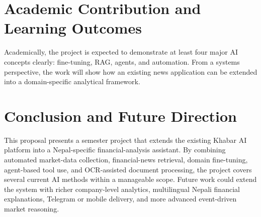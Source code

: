 \documentclass[12pt,a4paper]{report}
\begin{document}
\section{Academic Contribution and Learning Outcomes}
Academically, the project is expected to demonstrate at least four major AI concepts clearly: fine-tuning, \ac{RAG}, agents, and automation. From a systems perspective, the work will show how an existing news application can be extended into a domain-specific analytical framework.

\section{Conclusion and Future Direction}
This proposal presents a semester project that extends the existing Khabar AI platform into a Nepal-specific financial-analysis assistant. By combining automated market-data collection, financial-news retrieval, domain fine-tuning, agent-based tool use, and OCR-assisted document processing, the project covers several current AI methods within a manageable scope. Future work could extend the system with richer company-level analytics, multilingual Nepali financial explanations, Telegram or mobile delivery, and more advanced event-driven market reasoning.
\end{document}
